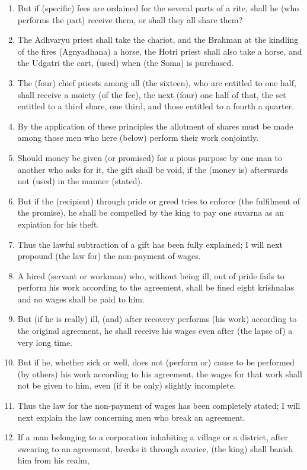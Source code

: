 \begin{enumerate}
\item But if (specific) fees are ordained for the several parts of a rite, shall he (who performs the part) receive them, or shall they all share them?
\item The Adhvaryu priest shall take the chariot, and the Brahman at the kindling of the fires (Agnyadhana) a horse, the Hotri priest shall also take a horse, and the Udgatri the cart, (used) when (the Soma) is purchased.
\item The (four) chief priests among all (the sixteen), who are entitled to one half, shall receive a moiety (of the fee), the next (four) one half of that, the set entitled to a third share, one third, and those entitled to a fourth a quarter.
\item By the application of these principles the allotment of shares must be made among those men who here (below) perform their work conjointly.
\item Should money be given (or promised) for a pious purpose by one man to another who asks for it, the gift shall be void, if the (money is) afterwards not (used) in the manner (stated).
\item But if the (recipient) through pride or greed tries to enforce (the fulfilment of the promise), he shall be compelled by the king to pay one suvarna as an expiation for his theft.
\item Thus the lawful subtraction of a gift has been fully explained; I will next propound (the law for) the non-payment of wages.
\item A hired (servant or workman) who, without being ill, out of pride fails to perform his work according to the agreement, shall be fined eight krishnalas and no wages shall be paid to him.
\item But (if he is really) ill, (and) after recovery performs (his work) according to the original agreement, he shall receive his wages even after (the lapse of) a very long time.
\item But if he, whether sick or well, does not (perform or) cause to be performed (by others) his work according to his agreement, the wages for that work shall not be given to him, even (if it be only) slightly incomplete.
\item Thus the law for the non-payment of wages has been completely stated; I will next explain the law concerning men who break an agreement.
\item If a man belonging to a corporation inhabiting a village or a district, after swearing to an agreement, breaks it through avarice, (the king) shall banish him from his realm,

\end{enumerate}
